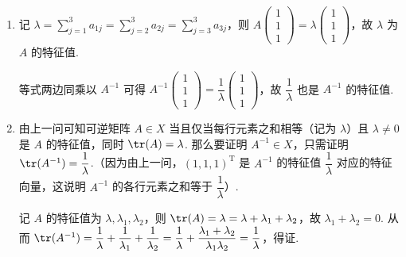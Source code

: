 \begin{enumerate}
\begin{enumerate}
        \item 记 $\lambda=\displaystyle\sum_{j=1}^3 a_{1j} = \displaystyle\sum_{j=2}^3 a_{2j} = \displaystyle\sum_{j=3}^3 a_{3j}$，则 $A\begin{pmatrix}
            1 \\ 1 \\ 1
        \end{pmatrix} = \lambda \begin{pmatrix}
            1 \\ 1 \\ 1
        \end{pmatrix}$，故 $\lambda$ 为 $A$ 的特征值.

        等式两边同乘以 $A^{-1}$ 可得 $A^{-1}\begin{pmatrix}
            1 \\ 1 \\ 1
        \end{pmatrix} = \dfrac{1}{\lambda} \begin{pmatrix}
            1 \\ 1 \\ 1
        \end{pmatrix}$，故 $\dfrac{1}{\lambda}$ 也是 $A^{-1}$ 的特征值.
        \item 由上一问可知可逆矩阵 $A \in X$ 当且仅当每行元素之和相等（记为 $\lambda$）且 $\lambda \neq 0$ 是 $A$ 的特征值，同时 $\tr(A) = \lambda$. 那么要证明 $A^{-1} \in X$，只需证明 $\tr(A^{-1}) = \dfrac{1}{\lambda}$.（因为由上一问，$(1,1,1)^\mathrm{T}$ 是 $A^{-1}$ 的特征值 $\dfrac{1}{\lambda}$ 对应的特征向量，这说明 $A^{-1}$ 的各行元素之和等于 $\dfrac{1}{\lambda}$）.

        记 $A$ 的特征值为 $\lambda, \lambda_1, \lambda_2$，则 $\tr(A) = \lambda = \lambda + \lambda_1 + \lambda_2$，故 $\lambda_1 + \lambda_2 = 0$. 从而 $\tr(A^{-1}) = \dfrac{1}{\lambda} + \dfrac{1}{\lambda_1} + \dfrac{1}{\lambda_2} = \dfrac{1}{\lambda} + \dfrac{\lambda_1 + \lambda_2}{\lambda_1 \lambda_2} = \dfrac{1}{\lambda}$，得证.
    \end{enumerate}


\end{enumerate}
